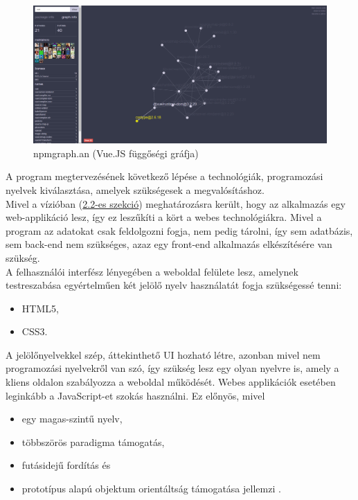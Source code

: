 	\begin{figure}[!h]
		\centering
		\includegraphics[scale=0.15]{images/anvaka_npmgraph.png}
		\caption{npmgraph.an (Vue.JS függőségi gráfja) \cite{npmgraph}}
		\label{fig:sw-npmgraph}
	\end{figure}
	
	\pagebreak


A program megtervezésének következő lépése a technológiák, programozási nyelvek kiválasztása, amelyek szükségesek a megvalósításhoz.\\

Mivel a vízióban (\hyperlink{section.2.2}{2.2-es szekció}) meghatározásra került, hogy az alkalmazás egy web-applikáció lesz, így ez leszűkíti a kört a webes technológiákra. Mivel a program az adatokat csak feldolgozni fogja, nem pedig tárolni, így sem adatbázis, sem back-end nem szükséges, azaz egy front-end alkalmazás elkészítésére van szükség.\\

A felhasználói interfész lényegében a weboldal felülete lesz, amelynek testreszabása egyértelműen két jelölő nyelv használatát fogja szükségessé tenni:
\begin{itemize}
	\item HTML5,
	\item CSS3.
\end{itemize}

A jelölőnyelvekkel szép, áttekinthető UI hozható létre, azonban mivel nem programozási nyelvekről van szó, így szükség lesz egy olyan nyelvre is, amely a kliens oldalon szabályozza a weboldal működését. Webes applikációk esetében leginkább a JavaScript-et szokás használni. Ez előnyös, mivel

\begin{itemize}
	\item egy magas-szintű nyelv,
	\item többszörös paradigma támogatás,
	\item futásidejű fordítás és
	\item prototípus alapú objektum orientáltság támogatása jellemzi \cite{javascript}. 
\end{itemize}

